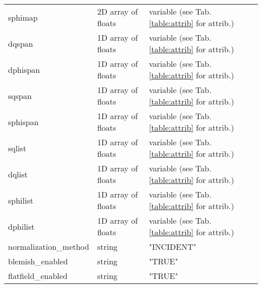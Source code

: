 \begin{table}[h!]
\begin{tabular}{p{3.5cm} p{4.0cm}  p{4.5cm} }
sphimap & 2D array of floats & variable (see Tab. \ref{table:attrib} for attrib.)  \\
dqspan & 1D array of floats & variable (see Tab. \ref{table:attrib} for attrib.)  \\
dphispan & 1D array of floats & variable (see Tab. \ref{table:attrib} for attrib.)  \\
sqspan & 1D array of floats & variable (see Tab. \ref{table:attrib} for attrib.)  \\
sphispan & 1D array of floats & variable (see Tab. \ref{table:attrib} for attrib.)  \\
sqlist & 1D array of floats & variable (see Tab. \ref{table:attrib} for attrib.)  \\
dqlist & 1D array of floats & variable (see Tab. \ref{table:attrib} for attrib.)  \\
sphilist & 1D array of floats & variable (see Tab. \ref{table:attrib} for attrib.)  \\
dphilist & 1D array of floats & variable (see Tab. \ref{table:attrib} for attrib.)  \\
normalization\_method & string & "INCIDENT" \\
blemish\_enabled & string & "TRUE" \\
flatfield\_enabled & string & "TRUE" \\
\bottomrule
\end{tabular}
\end{table}














